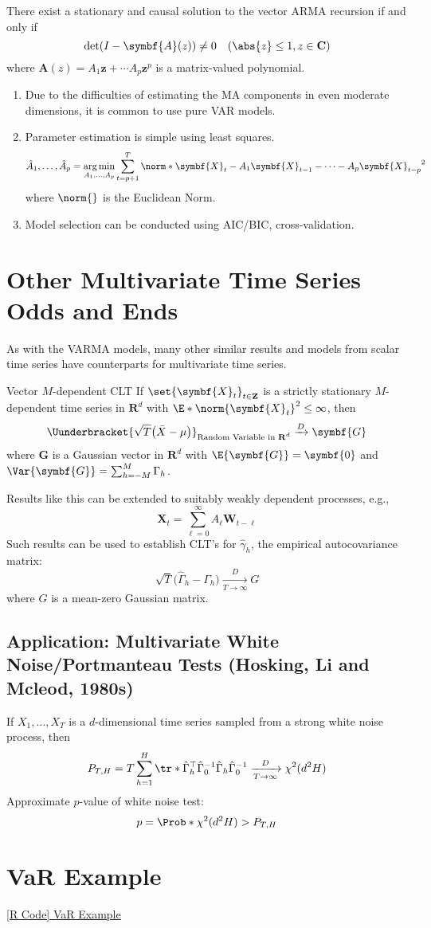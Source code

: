 \begin{Theorem}{}{}
    There exist a stationary and causal solution to the vector ARMA recursion if and only if
    \[ \det(I-\symbf{A}(z))\ne 0\quad(\abs{z}\le 1,z\in\mathbf{C}) \]
    where $ \symbf{A}(z)=A_1 \symbf{z}+\cdots A_p \symbf{z}^p $ is a matrix-valued polynomial.
\end{Theorem}
\begin{Remark}{}{}
    \begin{enumerate}[(1)]
        \item Due to the difficulties of estimating the MA components in even moderate dimensions,
              it is common to use pure VAR models.
        \item Parameter estimation is simple using least squares.
              \[ \hat{A}_1,\ldots,\hat{A}_p=\argmin_{A_1,\ldots,A_p}
                  \sum_{t=p+1}^{T}\norm*{\symbf{X}_t-A_1 \symbf{X}_{t-1}-\cdots -A_p \symbf{X}_{t-p}}^2  \]
              where $ \norm{} $ is the Euclidean Norm.
        \item Model selection can be conducted using AIC/BIC, cross-validation.
    \end{enumerate}
\end{Remark}
\section{Other Multivariate Time Series Odds and Ends}
As with the VARMA models, many other similar results and models
from scalar time series have counterparts for multivariate time series.
\begin{Theorem}{Vector $ M $-dependent CLT}{}
    If $ \set{\symbf{X}_t}_{t\in\mathbf{Z}} $ is a strictly stationary $ M $-dependent
    time series in $ \mathbf{R}^d $ with $ \E*{\norm{\symbf{X}_t}^2}\le \infty $, then
    \[ \Uunderbracket{\sqrt{T}\bigl(\bar{X}-\mu\bigr)}_{\text{Random Variable in $ \mathbf{R}^d $}}\xrightarrow{D}\symbf{G} \]
    where $ \symbf{G} $ is a Gaussian vector in $ \mathbf{R}^d $
    with $ \E{\symbf{G}}=\symbf{0} $ and $ \Var{\symbf{G}}=\sum_{h=-M}^{M} \Gamma_h $.
\end{Theorem}
Results like this can be extended to suitably weakly dependent processes, e.g.,
\[ \symbf{X}_t=\sum_{\ell=0}^{\infty} A_\ell \symbf{W}_{t-\ell} \]
Such results can be used to establish CLT's for $ \hat{\gamma}_h $,
the empirical autocovariance matrix:
\[ \sqrt{T}\bigl(\hat{\Gamma}_h-\Gamma_h\bigr)\xrightarrow[T\to\infty]{D}G \]
where $ G $ is a mean-zero Gaussian matrix.
\subsection*{Application: Multivariate White Noise/Portmanteau Tests (Hosking, Li and Mcleod, 1980s)}
If $ X_1,\ldots,X_T $ is a $ d $-dimensional time series sampled from a strong white noise process, then
\[ P_{T,H}=T \sum_{h=1}^{H} \tr*{\hat{\Gamma}_h^\top \hat{\Gamma}_0^{-1}\hat{\Gamma}_h\hat{\Gamma}_0^{-1}}
    \xrightarrow[T\to\infty]{D}\chi^2(d^2 H) \]
Approximate $ p $-value of white noise test:
\[ p=\Prob*{\chi^2(d^2 H)>P_{T,H}} \]
\section{VaR Example}
\href{https://github.com/Hextical/university-notes/blob/master/year-3/semester-2/STAT%20443/code/11.4%20-%20VaR%20Example.R}{[R Code] VaR Example}
